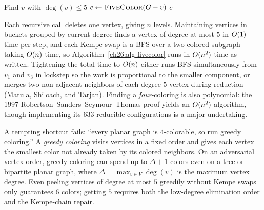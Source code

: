 \begin{algorithm}[H]
\caption{\textsc{FiveColor}($\Gph$) -- recursive Kempe-chain coloring}
\label{ch26:alg-fivecolor}
Find $v$ with $\deg(v)\le 5$
$c \gets \textsc{FiveColor}(G - v)$\;
\Return $c$\;
\end{algorithm}

\begin{complexitybox}
Each recursive call deletes one vertex, giving $n$ levels. Maintaining vertices in buckets
grouped by current degree finds a vertex of degree at most $5$ in $O(1)$ time per step,
and each Kempe swap is a BFS over a two-colored subgraph taking $O(n)$ time, so
Algorithm~\ref{ch26:alg-fivecolor} runs in $O(n^2)$ time as written. Tightening the total
time to $O(n)$ either runs BFS simultaneously from $v_1$ and $v_3$ in lockstep so the work
is proportional to the smaller component, or merges two non-adjacent neighbors of each
degree-$5$ vertex during reduction (Matula, Shiloach, and Tarjan). Finding a \emph{four}-coloring
is also polynomial: the 1997 Robertson--Sanders--Seymour--Thomas proof yields an $O(n^2)$
algorithm, though implementing its $633$ reducible configurations is a major undertaking.
\end{complexitybox}

\begin{trapbox}
A tempting shortcut fails: ``every planar graph is $4$-colorable, so run greedy coloring.''
A \emph{greedy coloring} visits vertices in a fixed order and gives each vertex the smallest
color not already taken by its colored neighbors. On an adversarial vertex order, greedy
coloring can spend up to $\Delta + 1$ colors even on a tree or bipartite planar graph, where
$\Delta = \max_{v \in V} \deg(v)$ is the maximum vertex degree. Even peeling vertices of
degree at most $5$ greedily without Kempe swaps only guarantees $6$ colors; getting $5$
requires both the low-degree elimination order and the Kempe-chain repair.
\end{trapbox}

